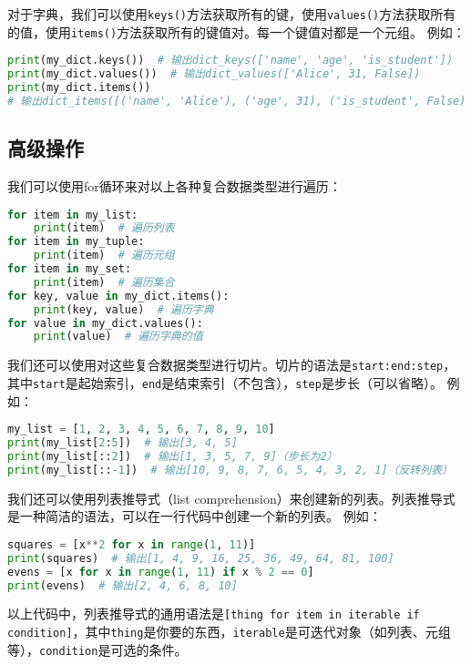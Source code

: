 \documentclass[../main.tex]{subfiles}
\begin{document}
对于字典，我们可以使用\texttt{keys()}方法获取所有的键，使用\texttt{values()}方法获取所有的值，使用\texttt{items()}方法获取所有的键值对。每一个键值对都是一个元组。
例如：

\begin{lstlisting}[language=python]
print(my_dict.keys())  # 输出dict_keys(['name', 'age', 'is_student'])
print(my_dict.values())  # 输出dict_values(['Alice', 31, False])
print(my_dict.items())  
# 输出dict_items([('name', 'Alice'), ('age', 31), ('is_student', False)])
\end{lstlisting}

\subsection{高级操作}

我们可以使用for循环来对以上各种复合数据类型进行遍历：
\begin{lstlisting}[language=python]
for item in my_list:
    print(item)  # 遍历列表
for item in my_tuple:
    print(item)  # 遍历元组
for item in my_set:
    print(item)  # 遍历集合
for key, value in my_dict.items():
    print(key, value)  # 遍历字典
for value in my_dict.values():
    print(value)  # 遍历字典的值
\end{lstlisting}

我们还可以使用对这些复合数据类型进行切片。切片的语法是\texttt{start:end:step}，其中\texttt{start}是起始索引，\texttt{end}是结束索引（不包含），\texttt{step}是步长（可以省略）。
例如：
\begin{lstlisting}[language=python]
my_list = [1, 2, 3, 4, 5, 6, 7, 8, 9, 10]
print(my_list[2:5])  # 输出[3, 4, 5]
print(my_list[::2])  # 输出[1, 3, 5, 7, 9]（步长为2）
print(my_list[::-1])  # 输出[10, 9, 8, 7, 6, 5, 4, 3, 2, 1]（反转列表）
\end{lstlisting}

我们还可以使用列表推导式（list comprehension）来创建新的列表。列表推导式是一种简洁的语法，可以在一行代码中创建一个新的列表。
例如：
\begin{lstlisting}[language=python]
squares = [x**2 for x in range(1, 11)] 
print(squares)  # 输出[1, 4, 9, 16, 25, 36, 49, 64, 81, 100]
evens = [x for x in range(1, 11) if x % 2 == 0]  
print(evens)  # 输出[2, 4, 6, 8, 10]
\end{lstlisting}

以上代码中，列表推导式的通用语法是\texttt{[thing for item in iterable if condition]}，其中\texttt{thing}是你要的东西，\texttt{iterable}是可迭代对象（如列表、元组等），\texttt{condition}是可选的条件。
\end{document}

